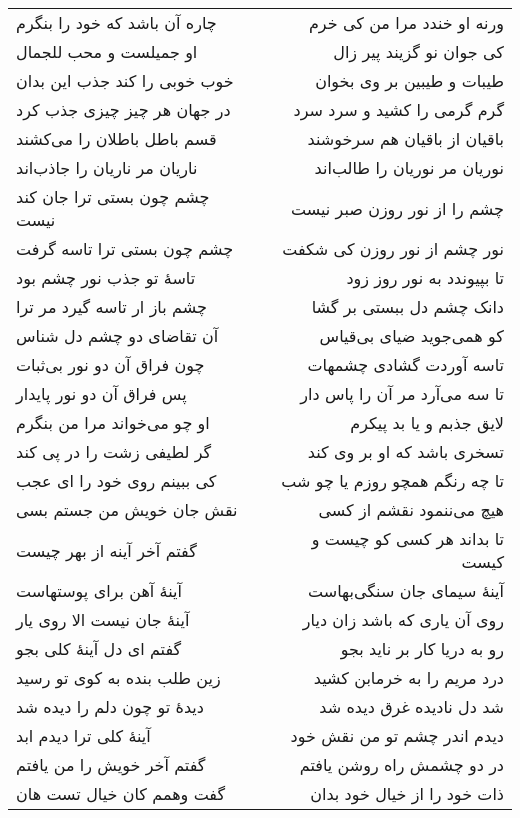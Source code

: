 \begin{center}
\begin{longtable}{l p{0.5cm} r}
\\
چاره آن باشد که خود را بنگرم
&&
ورنه او خندد مرا من کی خرم
\\
او جمیلست و محب للجمال
&&
کی جوان نو گزیند پیر زال
\\
خوب خوبی را کند جذب این بدان
&&
طیبات و طیبین بر وی بخوان
\\
در جهان هر چیز چیزی جذب کرد
&&
گرم گرمی را کشید و سرد سرد
\\
قسم باطل باطلان را می‌کشند
&&
باقیان از باقیان هم سرخوشند
\\
ناریان مر ناریان را جاذب‌اند
&&
نوریان مر نوریان را طالب‌اند
\\
چشم چون بستی ترا جان کند نیست
&&
چشم را از نور روزن صبر نیست
\\
چشم چون بستی ترا تاسه گرفت
&&
نور چشم از نور روزن کی شکفت
\\
تاسهٔ تو جذب نور چشم بود
&&
تا بپیوندد به نور روز زود
\\
چشم باز ار تاسه گیرد مر ترا
&&
دانک چشم دل ببستی بر گشا
\\
آن تقاضای دو چشم دل شناس
&&
کو همی‌جوید ضیای بی‌قیاس
\\
چون فراق آن دو نور بی‌ثبات
&&
تاسه آوردت گشادی چشمهات
\\
پس فراق آن دو نور پایدار
&&
تا سه می‌آرد مر آن را پاس دار
\\
او چو می‌خواند مرا من بنگرم
&&
لایق جذبم و یا بد پیکرم
\\
گر لطیفی زشت را در پی کند
&&
تسخری باشد که او بر وی کند
\\
کی ببینم روی خود را ای عجب
&&
تا چه رنگم همچو روزم یا چو شب
\\
نقش جان خویش من جستم بسی
&&
هیچ می‌ننمود نقشم از کسی
\\
گفتم آخر آینه از بهر چیست
&&
تا بداند هر کسی کو چیست و کیست
\\
آینهٔ آهن برای پوستهاست
&&
آینهٔ سیمای جان سنگی‌بهاست
\\
آینهٔ جان نیست الا روی یار
&&
روی آن یاری که باشد زان دیار
\\
گفتم ای دل آینهٔ کلی بجو
&&
رو به دریا کار بر ناید بجو
\\
زین طلب بنده به کوی تو رسید
&&
درد مریم را به خرمابن کشید
\\
دیدهٔ تو چون دلم را دیده شد
&&
شد دل نادیده غرق دیده شد
\\
آینهٔ کلی ترا دیدم ابد
&&
دیدم اندر چشم تو من نقش خود
\\
گفتم آخر خویش را من یافتم
&&
در دو چشمش راه روشن یافتم
\\
گفت وهمم کان خیال تست هان
&&
ذات خود را از خیال خود بدان
\\

\end{longtable}
\end{center}

